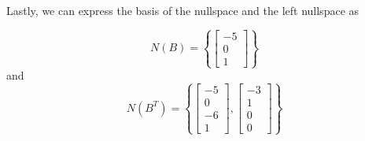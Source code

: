 Lastly, we can express the basis of the nullspace and the left nullspace as
\begin{mdframed}[style=MyFrame]
    \begin{equation}
        N(B) = 
        \left\{
        \begin{bmatrix}
            -5      \\
            0       \\
            1
        \end{bmatrix}
        \right\}
    \end{equation}
    and 
    \begin{equation}
        N(B^{T}) = 
        \left\{
        \begin{bmatrix}
            -5      \\
            0       \\
            -6      \\
            1
        \end{bmatrix},
        \begin{bmatrix}
            -3      \\
            1       \\
            0       \\
            0
        \end{bmatrix}
        \right\}
    \end{equation}
\end{mdframed}

